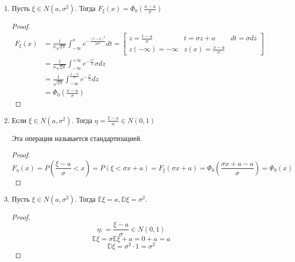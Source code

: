 \begin{enumerate}
    \item Пусть \(\xi \in N(a, \sigma^2)\). Тогда \(F_\xi(x) = \Phi_0\left( \frac{x - a}{\sigma} \right)\)
          \begin{proof}
              \begin{align*}
                  F_\xi(x) & = \frac{1}{\sigma\sqrt{2\pi}} \int_{ -\infty}^{x} e^{ - \frac{(t - a)^2}{2\sigma^2}} dt = \begin{bmatrix}
                      z = \frac{t - a}{\sigma} & t = \sigma z + a            & dt = \sigma dz \\
                      z( -\infty) = -\infty    & z(x) = \frac{x - a}{\sigma}
                  \end{bmatrix} \\
                           & = \frac{1}{\sigma \sqrt{2\pi}} \int_{ -\infty}^{+\infty} e^{ - \frac{x^2}{2}} \sigma dz                              \\
                           & = \frac{1}{\sqrt{2\pi}} \int_{ -\infty}^{\frac{x - a}{\sigma}} e^{ - \frac{z^2}{2}} dz                               \\
                           & = \Phi_0\left(\frac{x - a}{\sigma}\right)
              \end{align*}
          \end{proof}
    \item Если \(\xi \in N(a, \sigma^2)\). Тогда \(\eta = \frac{\xi - a}{\sigma} \in N(0, 1)\)

          \begin{remark}
              Эта операция называется стандартизацией.
          \end{remark}

          \begin{proof}
              \[F_\eta(x) = P\left( \frac{\xi - a}{\sigma} < x \right) = P(\xi < \sigma x + a) = F_\xi(\sigma x + a) = \Phi_0\left( \frac{\sigma x + a - a}{\sigma} \right) = \Phi_0(x)\]
          \end{proof}

    \item Пусть \(\xi \in N(a, \sigma^2)\). Тогда \(\mathbb{E}\xi = a, \mathbb{D}\xi = \sigma^2\).
          \begin{proof}
              \[\eta : = \frac{\xi - a}{\sigma} \in N(0, 1)\]
              \[\mathbb{E}\xi = \sigma \mathbb{E}\xi + a = 0 + a = a\]
              \[\mathbb{D}\xi = \sigma^2 \cdot 1 = \sigma^2\]
          \end{proof}


\end{enumerate}
